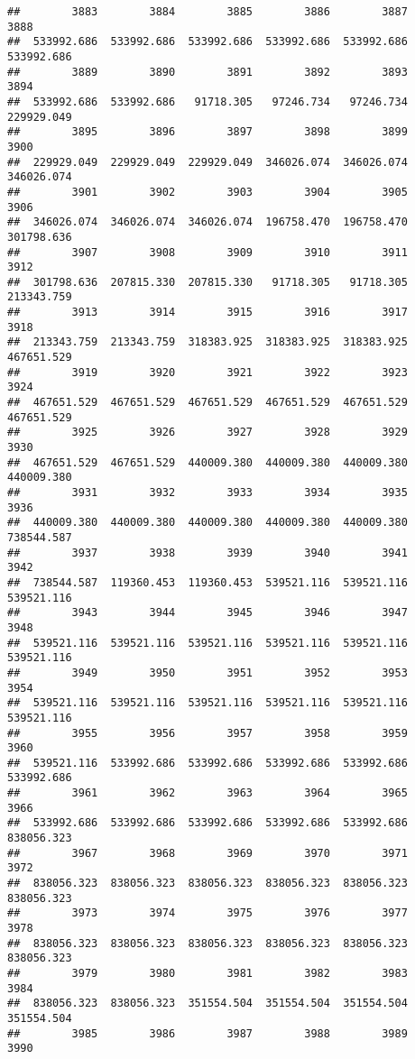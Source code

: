 \documentclass[
]{book}
\begin{document}
\begin{verbatim}
##        3883        3884        3885        3886        3887        3888 
##  533992.686  533992.686  533992.686  533992.686  533992.686  533992.686 
##        3889        3890        3891        3892        3893        3894 
##  533992.686  533992.686   91718.305   97246.734   97246.734  229929.049 
##        3895        3896        3897        3898        3899        3900 
##  229929.049  229929.049  229929.049  346026.074  346026.074  346026.074 
##        3901        3902        3903        3904        3905        3906 
##  346026.074  346026.074  346026.074  196758.470  196758.470  301798.636 
##        3907        3908        3909        3910        3911        3912 
##  301798.636  207815.330  207815.330   91718.305   91718.305  213343.759 
##        3913        3914        3915        3916        3917        3918 
##  213343.759  213343.759  318383.925  318383.925  318383.925  467651.529 
##        3919        3920        3921        3922        3923        3924 
##  467651.529  467651.529  467651.529  467651.529  467651.529  467651.529 
##        3925        3926        3927        3928        3929        3930 
##  467651.529  467651.529  440009.380  440009.380  440009.380  440009.380 
##        3931        3932        3933        3934        3935        3936 
##  440009.380  440009.380  440009.380  440009.380  440009.380  738544.587 
##        3937        3938        3939        3940        3941        3942 
##  738544.587  119360.453  119360.453  539521.116  539521.116  539521.116 
##        3943        3944        3945        3946        3947        3948 
##  539521.116  539521.116  539521.116  539521.116  539521.116  539521.116 
##        3949        3950        3951        3952        3953        3954 
##  539521.116  539521.116  539521.116  539521.116  539521.116  539521.116 
##        3955        3956        3957        3958        3959        3960 
##  539521.116  533992.686  533992.686  533992.686  533992.686  533992.686 
##        3961        3962        3963        3964        3965        3966 
##  533992.686  533992.686  533992.686  533992.686  533992.686  838056.323 
##        3967        3968        3969        3970        3971        3972 
##  838056.323  838056.323  838056.323  838056.323  838056.323  838056.323 
##        3973        3974        3975        3976        3977        3978 
##  838056.323  838056.323  838056.323  838056.323  838056.323  838056.323 
##        3979        3980        3981        3982        3983        3984 
##  838056.323  838056.323  351554.504  351554.504  351554.504  351554.504 
##        3985        3986        3987        3988        3989        3990 

\end{verbatim}
\end{document}

